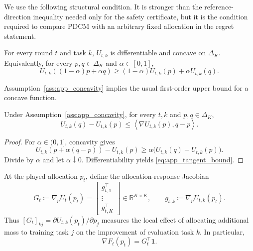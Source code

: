 We use the following structural condition. It is stronger than the reference-direction inequality needed only for the safety certificate, but it is the condition required to compare PDCM with an arbitrary fixed allocation in the regret statement.

\begin{assumption}
\label{ass:app_concavity}
For every round $t$ and task $k$, $U_{t,k}$ is differentiable and concave on $\Delta_K$. Equivalently, for every $p,q\in\Delta_K$ and $\alpha\in[0,1]$,
\begin{equation}
    U_{t,k}((1-\alpha)p+\alpha q)
    \ge
    (1-\alpha)U_{t,k}(p)+\alpha U_{t,k}(q).
    \label{eq:app_line_concavity}
\end{equation}
\end{assumption}

Assumption~\ref{ass:app_concavity} implies the usual first-order upper bound for a concave function.

\begin{lemma}
\label{lem:app_tangent}
Under Assumption~\ref{ass:app_concavity}, for every $t,k$ and $p,q\in\Delta_K$,
\begin{equation}
    U_{t,k}(q)-U_{t,k}(p)
    \le
    \left\langle \nabla U_{t,k}(p),q-p\right\rangle.
    \label{eq:app_tangent_bound}
\end{equation}
\end{lemma}

\begin{proof}
For $\alpha\in(0,1]$, concavity gives
\begin{equation}
    U_{t,k}\!\left(p+\alpha(q-p)\right)-U_{t,k}(p)
    \ge
    \alpha\bigl(U_{t,k}(q)-U_{t,k}(p)\bigr).
\end{equation}
Divide by $\alpha$ and let $\alpha\downarrow 0$. Differentiability yields \eqref{eq:app_tangent_bound}.
\end{proof}

At the played allocation $p_t$, define the allocation-response Jacobian
\begin{equation}
    G_t
    \coloneqq
    \nabla_p U_t(p_t)
    =
    \begin{bmatrix}
        g_{t,1}^{\top}\\
        \vdots\\
        g_{t,K}^{\top}
    \end{bmatrix}
    \in\mathbb{R}^{K\times K},
    \qquad
    g_{t,k}\coloneqq \nabla_p U_{t,k}(p_t).
    \label{eq:app_jacobian}
\end{equation}
Thus $[G_t]_{kj}=\partial U_{t,k}(p_t)/\partial p_j$ measures the local effect of allocating additional mass to training task $j$ on the improvement of evaluation task $k$. In particular,
\begin{equation}
    \nabla F_t(p_t)=G_t^\top\mathbf{1}.
    \label{eq:app_aggregate_gradient}
\end{equation}

